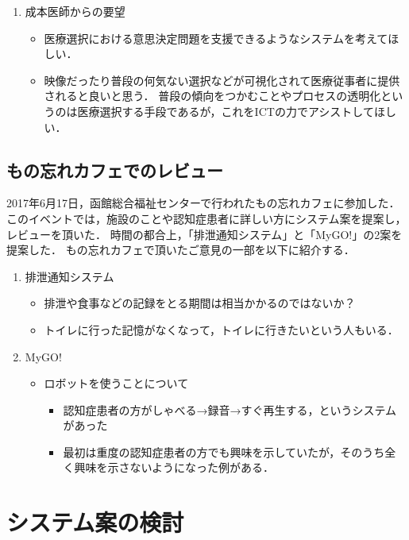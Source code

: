 \documentclass[../report]{subfiles}
\begin{document}
\begin{enumerate}
    \item[] 成本医師からの要望
\begin{itemize}
    \item 医療選択における意思決定問題を支援できるようなシステムを考えてほしい．
    \item 映像だったり普段の何気ない選択などが可視化されて医療従事者に提供されると良いと思う．
普段の傾向をつかむことやプロセスの透明化というのは医療選択する手段であるが，これをICTの力でアシストしてほしい．
\end{itemize}
\end{enumerate}

\subsection{もの忘れカフェでのレビュー}
2017年6月17日，函館総合福祉センターで行われたもの忘れカフェに参加した．
このイベントでは，施設のことや認知症患者に詳しい方にシステム案を提案し，レビューを頂いた．
時間の都合上，「排泄通知システム」と「MyGO!」の2案を提案した．
もの忘れカフェで頂いたご意見の一部を以下に紹介する．

\begin{enumerate}
    \item[] 排泄通知システム
\begin{itemize}
    \item 排泄や食事などの記録をとる期間は相当かかるのではないか？
    \item トイレに行った記憶がなくなって，トイレに行きたいという人もいる．
\end{itemize}

    \item[] MyGO!
\begin{itemize}
    \item ロボットを使うことについて
	\begin{itemize}
		\item 認知症患者の方がしゃべる→録音→すぐ再生する，というシステムがあった
		\item 最初は重度の認知症患者の方でも興味を示していたが，そのうち全く興味を示さないようになった例がある．
	\end{itemize}
\end{itemize}
\end{enumerate}

\section{システム案の検討}
\end{document}
